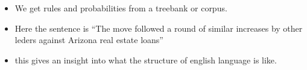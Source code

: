 \documentclass[11pt]{article}
\begin{document}
\begin{minipage}[l]{.5\linewidth}
    \begin{figure}[H]
        \centering
    \end{figure}    
\end{minipage}\hfill
\begin{minipage}[r]{.48\linewidth}
    \begin{itemize}
        \item We get rules and probabilities from a treebank or corpus.
        \item Here the sentence is ``The move followed a round of similar increases by other leders against Arizona real estate loans''
        \item this gives an insight into what the structure of english language is like.
    \end{itemize}
\end{minipage}

\begin{figure}[H]
    \centering
    \caption{}
\end{figure}    
\end{document}
